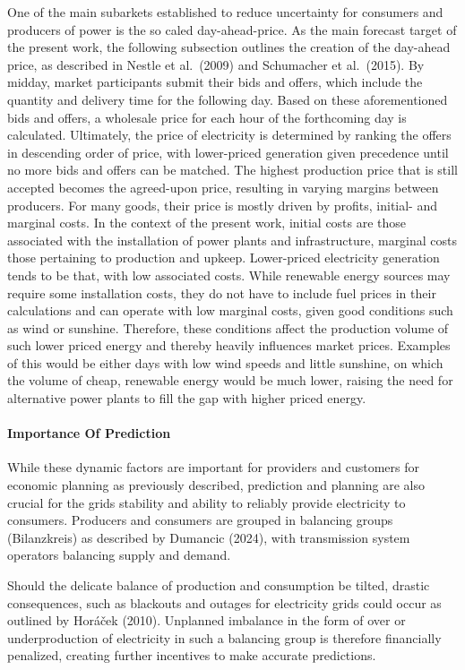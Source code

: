 \documentclass[a4paper]{article}
\begin{document}
One of the main subarkets established to reduce uncertainty for
consumers and producers of power is the so caled day-ahead-price. As the
main forecast target of the present work, the following subsection
outlines the creation of the day-ahead price, as described in Nestle et
al.~(2009) and Schumacher et al.~(2015). By midday, market participants
submit their bids and offers, which include the quantity and delivery
time for the following day. Based on these aforementioned bids and
offers, a wholesale price for each hour of the forthcoming day is
calculated. Ultimately, the price of electricity is determined by
ranking the offers in descending order of price, with lower-priced
generation given precedence until no more bids and offers can be
matched. The highest production price that is still accepted becomes the
agreed-upon price, resulting in varying margins between producers. For
many goods, their price is mostly driven by profits, initial- and
marginal costs. In the context of the present work, initial costs are
those associated with the installation of power plants and
infrastructure, marginal costs those pertaining to production and
upkeep. Lower-priced electricity generation tends to be that, with low
associated costs. While renewable energy sources may require some
installation costs, they do not have to include fuel prices in their
calculations and can operate with low marginal costs, given good
conditions such as wind or sunshine. Therefore, these conditions affect
the production volume of such lower priced energy and thereby heavily
influences market prices. Examples of this would be either days with low
wind speeds and little sunshine, on which the volume of cheap, renewable
energy would be much lower, raising the need for alternative power
plants to fill the gap with higher priced energy.

\paragraph{Importance Of Prediction}\label{importance-of-prediction}

While these dynamic factors are important for providers and customers
for economic planning as previously described, prediction and planning
are also crucial for the grids stability and ability to reliably provide
electricity to consumers. Producers and consumers are grouped in
balancing groups (Bilanzkreis) as described by Dumancic (2024), with
transmission system operators balancing supply and demand.

Should the delicate balance of production and consumption be tilted,
drastic consequences, such as blackouts and outages for electricity
grids could occur as outlined by Horáček (2010). Unplanned imbalance in
the form of over or underproduction of electricity in such a balancing
group is therefore financially penalized, creating further incentives to
make accurate predictions.
\end{document}
